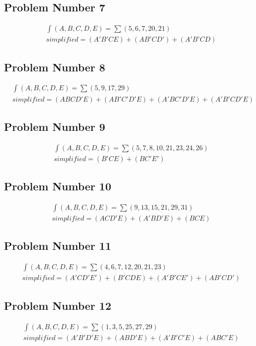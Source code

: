 \subsection{Problem Number 7}
\begin{align}
\nonumber
&\int(A,B,C,D,E) = \sum(5,6,7,20,21) \\
\nonumber
&simplified = (A'B'CE) + (AB'CD') + (A'B'CD)
\end{align}

\subsection{Problem Number 8}
\begin{align}
\nonumber
&\int(A,B,C,D,E) = \sum(5,9,17,29) \\
\nonumber
&simplified = (ABCD'E) + (AB'C'D'E) + (A'BC'D'E) + (A'B'CD'E)
\end{align}

\subsection{Problem Number 9}
\begin{align}
\nonumber
&\int(A,B,C,D,E) = \sum(5,7,8,10,21,23,24,26) \\
\nonumber
&simplified = (B'CE) + (BC'E')
\end{align}

\subsection{Problem Number 10}
\begin{align}
\nonumber
&\int(A,B,C,D,E) = \sum(9,13,15,21,29,31) \\
\nonumber
&simplified = (ACD'E) + (A'BD'E) + (BCE)
\end{align}

\subsection{Problem Number 11}
\begin{align}
\nonumber
&\int(A,B,C,D,E) = \sum(4,6,7,12,20,21,23) \\
\nonumber
&simplified = (A'CD'E') + (B'CDE) + (A'B'CE') + (AB'CD')
\end{align}

\subsection{Problem Number 12}
\begin{align}
\nonumber
&\int(A,B,C,D,E) = \sum(1,3,5,25,27,29) \\
\nonumber
&simplified = (A'B'D'E) + (ABD'E) + (A'B'C'E) + (ABC'E)
\end{align}

